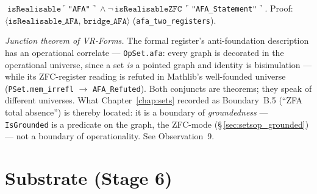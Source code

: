 \begin{theorem}
\label{thm:mixed_AFA_two_registers}
\leanok
{}
$\texttt{isRealisable}\,\ulcorner$\texttt{"AFA"}$\urcorner \land
\lnot\,\texttt{isRealisableZFC}\,\ulcorner$\texttt{"AFA\_Statement"}$\urcorner$.
Proof: $\langle\texttt{isRealisable\_AFA},\,\texttt{bridge\_AFA}\rangle$
(\texttt{afa\_two\_registers}).

\emph{Junction theorem of VR-Forms.}  The formal register's anti-foundation
description has an operational correlate --- \texttt{OpSet.afa}: every
graph is decorated in the operational universe, since a set \emph{is} a
pointed graph and identity is bisimulation --- while its ZFC-register
reading is refuted in Mathlib's well-founded universe
(\texttt{PSet.mem\_irrefl} $\to$ \texttt{AFA\_Refuted}).  Both conjuncts are
theorems; they speak of different universes.  What Chapter~\ref{chap:sets}
recorded as Boundary~B.5 (``ZFA total absence'') is thereby located: it is
a boundary of \emph{groundedness} --- \texttt{IsGrounded} is a predicate on
the graph, the ZFC-mode (\S\,\ref{sec:setsop_grounded}) --- not a boundary
of operationality.  See Observation~9.
\end{theorem}

\section{Substrate (Stage 6)}
\label{sec:forms_substrate}

